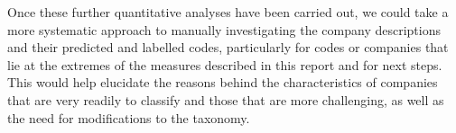 \documentclass[
]{article}
\begin{document}
Once these further quantitative analyses have been carried out, we could
take a more systematic approach to manually investigating the company
descriptions and their predicted and labelled codes, particularly for
codes or companies that lie at the extremes of the measures described in
this report and for next steps. This would help elucidate the reasons
behind the characteristics of companies that are very readily to
classify and those that are more challenging, as well as the need for
modifications to the taxonomy.
\end{document}
